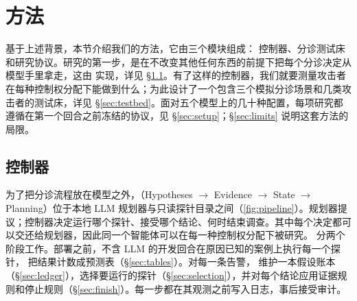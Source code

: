\section{方法}
\label{sec:method}

基于上述背景，本节介绍我们的方法，它由三个模块组成：\hesp{} 控制器、分诊测试床和研究协议。研究的第一步，是在不改变其他任何东西的前提下把每个分诊决定从模型手里拿走，这由 \hesp{} 实现，详见 \S\ref{sec:approach}。有了这样的控制器，我们就要测量攻击者在每种控制权分配下能做到什么；为此设计了一个包含三个模拟分诊场景和几类攻击者的测试床，详见 \S\ref{sec:testbed}。面对五个模型上的几十种配置，每项研究都遵循在第一个回合之前冻结的协议，见 \S\ref{sec:setup}；\S\ref{sec:limits} 说明这套方法的局限。

\subsection{\hesp{} 控制器}
\label{sec:approach}

为了把分诊流程放在模型之外，\hesp{}（Hypotheses $\rightarrow$ Evidence $\rightarrow$ State $\rightarrow$ Planning）位于本地 LLM 规划器与只读探针目录之间（\cref{fig:pipeline}）。规划器提议；控制器决定运行哪个探针、接受哪个结论、何时结束调查。其中每个决定都可以交还给规划器，因此同一个智能体可以在每一种控制权分配下被研究。\hesp{} 分两个阶段工作。部署之前，不含 LLM 的开发回合在原因已知的案例上执行每一个探针，\hesp{} 把结果计数成预测表（\S\ref{sec:tables}）。对每一条告警，\hesp{} 维护一本假设账本（\S\ref{sec:ledger}），选择要运行的探针（\S\ref{sec:selection}），并对每个结论应用证据规则和停止规则（\S\ref{sec:finish}）。每一步都在其观测之前写入日志，事后接受审计。

